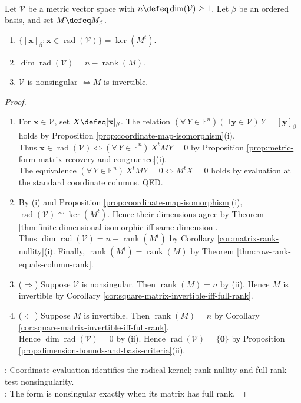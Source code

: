 \begin{proposition} \label{prop:metric-radical-coordinate-criteria} \\
Let $\mathcal{V}$ be a metric vector space with $n\defeq\dim(\mathcal{V})\geq1$. Let $\beta$ be an ordered basis, and set $M\defeq M_{\beta}$.
\begin{enumerate}[label=(\roman*)]
\setlength{\itemsep}{0pt}
\item $\{[\mathbf{x}]_{\beta}:\mathbf{x}\in\operatorname{rad}(\mathcal{V})\}=\ker(M^t)$.
\item $\dim\operatorname{rad}(\mathcal{V})=n-\operatorname{rank}(M)$.
\item $\mathcal{V}$ is nonsingular $\Longleftrightarrow M$ is invertible.
\end{enumerate}
\begin{proof}
\begin{enumerate}[label=(\roman*)]
\setlength{\itemsep}{0pt}
\item[$(i)$] For $\mathbf{x}\in\mathcal{V}$, set $X\defeq[\mathbf{x}]_{\beta}$. The relation $(\forall\,Y\in\mathbb{F}^n)(\exists\,\mathbf{y}\in\mathcal{V})\,Y=[\mathbf{y}]_{\beta}$ holds by Proposition \ref{prop:coordinate-map-isomorphism}(i).\\
Thus $\mathbf{x}\in\operatorname{rad}(\mathcal{V})\Longleftrightarrow(\forall\,Y\in\mathbb{F}^n)\,X^tMY=0$ by Proposition \ref{prop:metric-form-matrix-recovery-and-congruence}(i).\\
The equivalence $(\forall\,Y\in\mathbb{F}^n)\,X^tMY=0\Longleftrightarrow M^tX=0$ holds by evaluation at the standard coordinate columns. QED.
\item[$(ii)$] By (i) and Proposition \ref{prop:coordinate-map-isomorphism}(i), $\operatorname{rad}(\mathcal{V})\cong\ker(M^t)$. Hence their dimensions agree by Theorem \ref{thm:finite-dimensional-isomorphic-iff-same-dimension}.\\
Thus $\dim\operatorname{rad}(\mathcal{V})=n-\operatorname{rank}(M^t)$ by Corollary \ref{cor:matrix-rank-nullity}(i). Finally, $\operatorname{rank}(M^t)=\operatorname{rank}(M)$ by Theorem \ref{thm:row-rank-equals-column-rank}.
\item[$(iii)$] ($\Rightarrow$) Suppose $\mathcal{V}$ is nonsingular. Then $\operatorname{rank}(M)=n$ by (ii). Hence $M$ is invertible by Corollary \ref{cor:square-matrix-invertible-iff-full-rank}.
\item[$(iii)$] ($\Leftarrow$) Suppose $M$ is invertible. Then $\operatorname{rank}(M)=n$ by Corollary \ref{cor:square-matrix-invertible-iff-full-rank}.\\
Hence $\dim\operatorname{rad}(\mathcal{V})=0$ by (ii). Hence $\operatorname{rad}(\mathcal{V})=\{\mathbf{0}\}$ by Proposition \ref{prop:dimension-bounds-and-basis-criteria}(ii).
\end{enumerate}
: Coordinate evaluation identifies the radical kernel; rank-nullity and full rank test nonsingularity.\\
: The form is nonsingular exactly when its matrix has full rank.
\end{proof}
\end{proposition}

